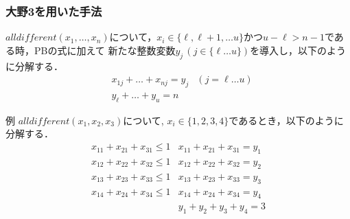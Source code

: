 \begin{frame}
    \frametitle{大野3を用いた手法}
    \begin{block}{}
        $alldifferent(x_1,\dots,x_n)$について，$x_i \in \{\ell,\ell+1,\dots u\}$かつ$u-\ell > n-1$である時，PBの式に加えて
        新たな整数変数$y_j \, (j \in \{\ell \dots u\})$を導入し，以下のように分解する．
        \vspace{-3mm}
        \begin{eqnarray*}
            & x_{1j} + \dots + x_{nj}  =  y_j & (j=\ell \dots u)\\
            & y_{\ell} + \dots + y_u  =  n    &
        \end{eqnarray*}
    \end{block}
    \begin{exampleblock}{例}
        $alldifferent(x_1, x_2, x_3)$について, $x_i \in \{1,2,3,4\}$であるとき，以下のように分解する．
        \vspace{-3mm}
        \begin{eqnarray*}
            x_{11} + x_{21} + x_{31} \leq 1 & x_{11} + x_{21} + x_{31} = y_1 \\
            x_{12} + x_{22} + x_{32} \leq 1 & x_{12} + x_{22} + x_{32} = y_2 \\
            x_{13} + x_{23} + x_{33} \leq 1 & x_{13} + x_{23} + x_{33} = y_3 \\
            x_{14} + x_{24} + x_{34} \leq 1 & x_{14} + x_{24} + x_{34} = y_4 \\
                                            & y_1 + y_2 + y_3 + y_4 = 3
        \end{eqnarray*}
    \end{exampleblock}
\end{frame}



